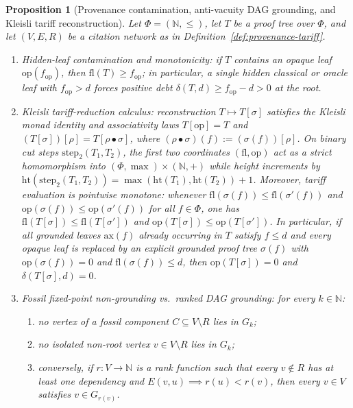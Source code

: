 \documentclass[11pt]{article}
\theoremstyle{plain}
\newtheorem{proposition}[theorem]{Proposition}
\theoremstyle{definition}
\begin{document}
\begin{proposition}[Provenance contamination, anti-vacuity DAG grounding, and Kleisli tariff reconstruction]\label{prop:provenance-grounding}
Let $\Phi = (\mathbb{N}, \le)$, let $T$ be a proof tree over $\Phi$, and let $(V, E, R)$ be a citation network as in Definition~\ref{def:provenance-tariff}.
\begin{enumerate}[nosep,label=(\roman*)]
\item \emph{Hidden-leaf contamination and monotonicity}: if $T$ contains an opaque leaf $\mathrm{op}(f_{\mathrm{op}})$, then $\mathrm{fl}(T) \ge f_{\mathrm{op}}$; in particular, a single hidden classical or oracle leaf with $f_{\mathrm{op}} > d$ forces positive debt $\delta(T, d) \ge f_{\mathrm{op}} - d > 0$ at the root.
\item \emph{Kleisli tariff-reduction calculus}: reconstruction $T \mapsto T[\sigma]$ satisfies the Kleisli monad identity and associativity laws $T[\mathrm{op}] = T$ and $(T[\sigma])[\rho] = T[\rho \bullet \sigma]$, where $(\rho \bullet \sigma)(f) := (\sigma(f))[\rho]$. On binary cut steps $\mathrm{step}_2(T_1, T_2)$, the first two coordinates $(\mathrm{fl}, \mathrm{op})$ act as a strict homomorphism into $(\Phi, \max) \times (\mathbb{N}, +)$ while height increments by $\mathrm{ht}(\mathrm{step}_2(T_1, T_2)) = \max(\mathrm{ht}(T_1), \mathrm{ht}(T_2)) + 1$. Moreover, tariff evaluation is pointwise monotone: whenever $\mathrm{fl}(\sigma(f)) \le \mathrm{fl}(\sigma'(f))$ and $\mathrm{op}(\sigma(f)) \le \mathrm{op}(\sigma'(f))$ for all $f \in \Phi$, one has $\mathrm{fl}(T[\sigma]) \le \mathrm{fl}(T[\sigma'])$ and $\mathrm{op}(T[\sigma]) \le \mathrm{op}(T[\sigma'])$. In particular, if all grounded leaves $\mathrm{ax}(f)$ already occurring in $T$ satisfy $f \le d$ and every opaque leaf is replaced by an explicit grounded proof tree $\sigma(f)$ with $\mathrm{op}(\sigma(f)) = 0$ and $\mathrm{fl}(\sigma(f)) \le d$, then $\mathrm{op}(T[\sigma]) = 0$ and $\delta(T[\sigma], d) = 0$.
\item \emph{Fossil fixed-point non-grounding vs.\ ranked DAG grounding}: for every $k \in \mathbb{N}$:
  \begin{enumerate}[nosep,label=(\alph*)]
  \item no vertex of a fossil component $C \subseteq V \setminus R$ lies in $G_k$;
  \item no isolated non-root vertex $v \in V \setminus R$ lies in $G_k$;
  \item conversely, if $r : V \to \mathbb{N}$ is a rank function such that every $v \notin R$ has at least one dependency and $E(v, u) \implies r(u) < r(v)$, then every $v \in V$ satisfies $v \in G_{r(v)}$.
  \end{enumerate}
\end{enumerate}
\end{proposition}
\end{document}
